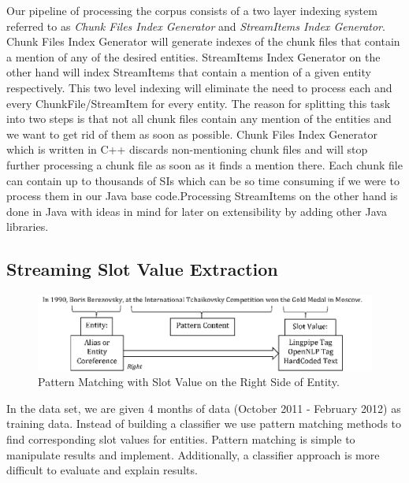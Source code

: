 Our pipeline of processing the corpus consists of a two layer indexing system 
referred to as \textit{Chunk Files Index Generator} and \textit{StreamItems Index Generator}.
Chunk Files Index Generator will generate indexes of the chunk files 
that contain a mention of any of the desired entities. StreamItems Index Generator 
on the other hand will index StreamItems that contain a mention of a given entity 
respectively. This two level indexing will eliminate the need to process each and 
every ChunkFile/StreamItem for every entity. The reason for splitting this task 
into two steps is that not all chunk files contain any mention of the entities and 
we want to get rid of them as soon as possible. Chunk Files Index Generator which 
is written in C++ discards non-mentioning chunk files and will stop further 
processing a chunk file as soon as it finds a mention there. Each chunk file can 
contain up to thousands of SIs which can be so time consuming if we were to 
process them in our Java base code.Processing StreamItems on the other hand is 
done in Java with ideas in mind for later on extensibility by adding other Java libraries.



\subsection{Streaming Slot Value Extraction}
\label{sec:ssve}
\begin{figure}
\centering
\includegraphics[width=6in]{./images/Pattern-eps-converted-to.pdf}
\vspace*{-.1in} \caption{Pattern Matching with Slot Value on the Right Side of Entity. }\label{fig:pattern}
\vspace*{-.2in}
\end{figure}

In the data set, we are given 4 months of data (October 2011 - February 2012) as training data.
Instead of building a classifier we use pattern matching methods to find
corresponding slot values for entities. 
Pattern matching is simple to manipulate results and implement.
Additionally, a classifier approach is more difficult to evaluate and explain results.

